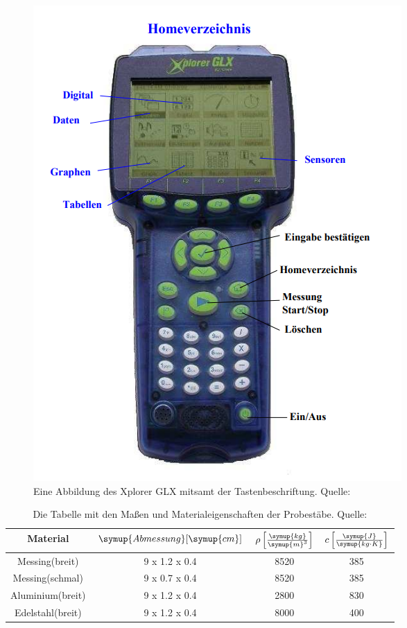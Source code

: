 \begin{figure}[H]
    \centering
    \includegraphics[scale=0.6]{content/GLX.png}
    \caption{Eine Abbildung des Xplorer GLX mitsamt der Tastenbeschriftung. Quelle:\cite{sample}}
    \label{fig:GLX}
\end{figure}
\begin{table}[H]
    \centering
    \caption{Die Tabelle mit den Maßen und Materialeigenschaften der Probestäbe. Quelle:\cite{sample}}
    \label{fig:Masse}
    \begin{tabular}{cccc}
        \toprule
        Material&
        {$\symup{Abmessung}[\symup{cm}]$} &
        {$\rho \left[\frac{\symup{kg}}{\symup{m}^3}\right]$} &
        {$c \left[\frac{\symup{J}}{\symup{kg\cdot K}}\right]$} \\
        \midrule
        Messing(breit) & 9 x 1.2 x 0.4 & 8520 & 385 \\
        Messing(schmal) & 9 x 0.7 x 0.4 & 8520 & 385 \\
        Aluminium(breit) & 9 x 1.2 x 0.4 & 2800 & 830 \\
        Edelstahl(breit) & 9 x 1.2 x 0.4 & 8000 & 400 \\
        \bottomrule
    \end{tabular}
\end{table}
